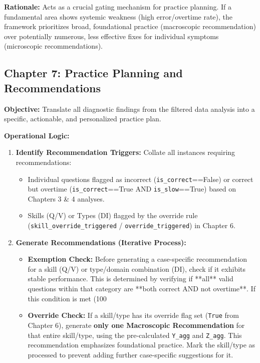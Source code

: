 \documentclass{article}
\begin{document}
\textbf{Rationale:} Acts as a crucial gating mechanism for practice planning. If a fundamental area shows systemic weakness (high error/overtime rate), the framework prioritizes broad, foundational practice (macroscopic recommendation) over potentially numerous, less effective fixes for individual symptoms (microscopic recommendations).

\subsection{Chapter 7: Practice Planning and Recommendations}

\textbf{Objective:} Translate all diagnostic findings from the filtered data analysis into a specific, actionable, and personalized practice plan.

\textbf{Operational Logic:}
\begin{enumerate}
    \item \textbf{Identify Recommendation Triggers:} Collate all instances requiring recommendations:
    \begin{itemize}
        \item Individual questions flagged as incorrect (\texttt{is\_correct}==False) or correct but overtime (\texttt{is\_correct}==True AND \texttt{is\_slow}==True) based on Chapters 3 \& 4 analyses.
        \item Skills (Q/V) or Types (DI) flagged by the override rule (\texttt{skill\_override\_triggered} / \texttt{override\_triggered}) in Chapter 6.
    \end{itemize}
    \item \textbf{Generate Recommendations (Iterative Process):}
    \begin{itemize}
        \item \textbf{Exemption Check:} Before generating a case-specific recommendation for a skill (Q/V) or type/domain combination (DI), check if it exhibits stable performance. This is determined by verifying if **all** valid questions within that category are **both correct AND not overtime**. If this condition is met (100%
        \item \textbf{Override Check:} If a skill/type has its override flag set (\texttt{True} from Chapter 6), generate \textbf{only one Macroscopic Recommendation} for that entire skill/type, using the pre-calculated \texttt{Y\_agg} and \texttt{Z\_agg}. This recommendation emphasizes foundational practice. Mark the skill/type as processed to prevent adding further case-specific suggestions for it.

\end{itemize}
\end{enumerate}
\end{document}
